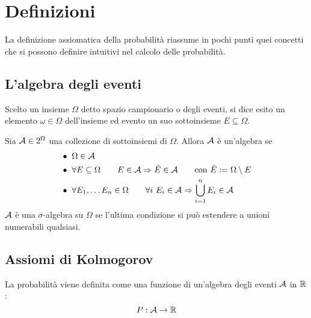 %
%
%
%


\section{Definizioni}
La definizione assiomatica della probabilità riassume in pochi punti quei concetti che si possono definire intuitivi nel calcolo delle probabilità.



\subsection{L'algebra degli eventi}
\begin{defin}
	Scelto un insieme $\Omega$ detto spazio campionario o degli eventi, si dice esito un elemento $\omega\in\Omega$ dell'insieme ed evento un suo sottoinsieme $E\subseteq\Omega$.

\end{defin}
\begin{defin}
	Sia $\mathcal A\in2^\Omega$ una collezione di sottoinsiemi di $\Omega$. Allora $\mathcal A$ è un'algebra se
	\begin{align*}
		 & \bullet ~ \Omega\in \mathcal A                                                                                            \\
		 & \bullet ~ \forall E\subseteq\Omega\qquad E\in\mathcal A\Rightarrow \bar E\in\mathcal A \qquad\text{con }\bar E:=\Omega\setminus E \\
		 & \bullet ~ \forall E_1,\dots E_n\in\Omega\qquad \forall i~E_i\in\mathcal A\Rightarrow \bigcup\limits_{i=1}^n E_i \in\mathcal A
	\end{align*}
	$\mathcal A$ è una $\sigma$-algebra su $\Omega$ se l'ultima condizione si può estendere a unioni numerabili qualsiasi.
\end{defin}




\subsection{Assiomi di Kolmogorov}
La probabilità viene definita come una funzione di un'algebra degli eventi $\mathcal A$ in $\mathbb R$:
\begin{equation*}
	P:\mathcal A\to\mathbb R
\end{equation*}

